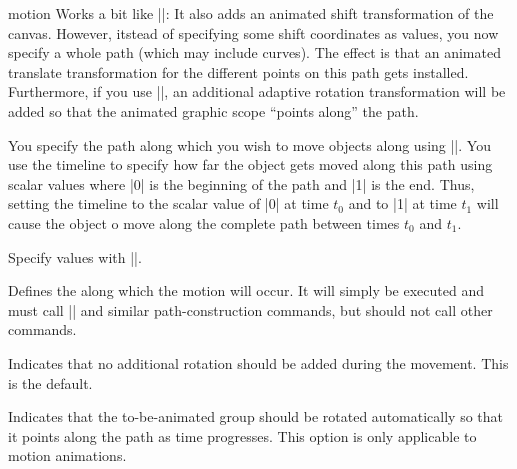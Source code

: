 \begin{sysanimateattribute}{motion}
  Works a bit like |\pgfsys@animation@translate|: It also adds an
  animated shift transformation of the canvas. However, itstead of
  specifying some shift coordinates as values, you now specify a whole
  path (which may include curves). The effect is that an animated
  translate transformation for the different points on this path gets
  installed. Furthermore, if you use |\pgfsys@animation@rotatealong|, an
  additional adaptive rotation transformation will be added so that
  the animated graphic scope ``points along'' the path.

  You specify the path along which you wish to move objects along
  using |\pgfsys@animation@movealong|. You use the timeline to specify
  how far the object gets moved along this path using scalar values
  where |0| is the beginning of the path and |1| is the end. Thus,
  setting the timeline to the scalar value of |0| at time $t_0$ and to
  |1| at time $t_1$ will cause the object o move along the complete
  path between times $t_0$ and $t_1$.
  
  Specify values with |\pgfsys@animation@val@scalar|.
    
  \begin{command}{\pgfsys@animation@movealong{}}
    Defines the  along which the motion will occur. It will
    simply be executed and must call |\pgfsys@lineto| and similar
    path-construction commands, but should not call other commands.
\begin{codeexample}[width=2cm]
\end{codeexample}
  \end{command}

  \begin{command}{\pgfsys@animation@norotatealong}
    Indicates that no additional rotation should be added during the
    movement. This is the default.
  \end{command}
  
  \begin{command}{\pgfsys@animation@rotatealong}
    Indicates that the to-be-animated group should be rotated
    automatically so that it points along the path as time
    progresses. This option is only applicable to motion animations.
\begin{codeexample}[width=2cm]
\end{codeexample}
  \end{command}

\end{sysanimateattribute}


